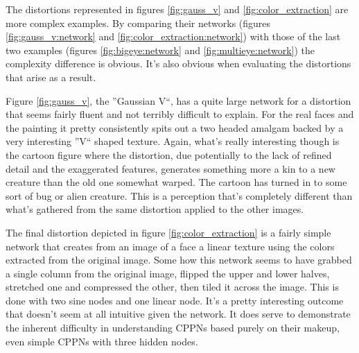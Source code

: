The distortions represented in figures \ref{fig:gauss_v} and \ref{fig:color_extraction} are more complex examples. By comparing their networks (figures \ref{fig:gauss_v:network} and \ref{fig:color_extraction:network}) with those of the last two examples (figures \ref{fig:bigeye:network} and \ref{fig:multieye:network}) the complexity difference is obvious. It's also obvious when evaluating the distortions that arise as a result.

Figure \ref{fig:gauss_v}, the ''Gaussian V``, has a quite large network for a distortion that seems fairly fluent and not terribly difficult to explain. For the real faces and the painting it pretty consistently spits out a two headed amalgam backed by a very interesting ''V`` shaped texture. Again, what's really interesting though is the cartoon figure where the distortion, due potentially to the lack of refined detail and the exaggerated features, generates something more a kin to a new creature than the old one somewhat warped. The cartoon has turned in to some sort of bug or alien creature. This is a perception that's completely different than what's gathered from the same distortion applied to the other images.

The final distortion depicted in figure \ref{fig:color_extraction} is a fairly simple network that creates from an image of a face a linear texture using the colors extracted from the original image. Some how this network seems to have grabbed a single column from the original image, flipped the upper and lower halves, stretched one and compressed the other, then tiled it across the image. This is done with two sine nodes and one linear node. It's a pretty interesting outcome that doesn't seem at all intuitive given the network. It does serve to demonstrate the inherent difficulty in understanding CPPNs based purely on their makeup, even simple CPPNs with three hidden nodes.